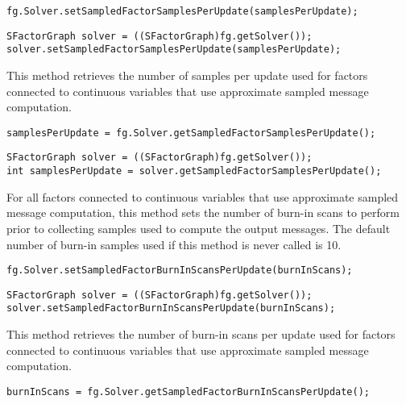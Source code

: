 \ifmatlab
\begin{lstlisting}
fg.Solver.setSampledFactorSamplesPerUpdate(samplesPerUpdate);
\end{lstlisting}
\fi

\ifjava
\begin{lstlisting}
SFactorGraph solver = ((SFactorGraph)fg.getSolver());
solver.setSampledFactorSamplesPerUpdate(samplesPerUpdate);
\end{lstlisting}
\fi



This method retrieves the number of samples per update used for factors connected to continuous variables that use approximate sampled message computation.

\ifmatlab
\begin{lstlisting}
samplesPerUpdate = fg.Solver.getSampledFactorSamplesPerUpdate();
\end{lstlisting}
\fi

\ifjava
\begin{lstlisting}
SFactorGraph solver = ((SFactorGraph)fg.getSolver());
int samplesPerUpdate = solver.getSampledFactorSamplesPerUpdate();
\end{lstlisting}
\fi



For all factors connected to continuous variables that use approximate sampled message computation, this method sets the number of burn-in scans to perform prior to collecting samples used to compute the output messages.  The default number of burn-in samples used if this method is never called is 10.

\ifmatlab
\begin{lstlisting}
fg.Solver.setSampledFactorBurnInScansPerUpdate(burnInScans);
\end{lstlisting}
\fi

\ifjava
\begin{lstlisting}
SFactorGraph solver = ((SFactorGraph)fg.getSolver());
solver.setSampledFactorBurnInScansPerUpdate(burnInScans);
\end{lstlisting}
\fi



This method retrieves the number of burn-in scans per update used for factors connected to continuous variables that use approximate sampled message computation.

\ifmatlab
\begin{lstlisting}
burnInScans = fg.Solver.getSampledFactorBurnInScansPerUpdate();
\end{lstlisting}
\fi

